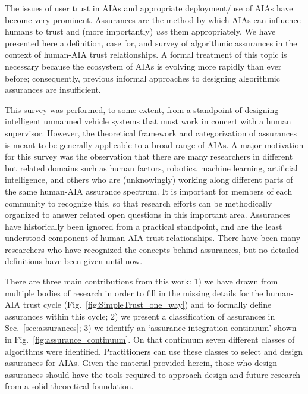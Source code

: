 The issues of user trust in AIAs and appropriate deployment/use of AIAs have become very prominent.  Assurances are the method by which AIAs can influence humans to trust and (more importantly) \emph{use} them appropriately. We have presented here a definition, case for, and survey of algorithmic assurances in the context of human-AIA trust relationships. A formal treatment of this topic is necessary because the ecosystem of AIAs is evolving more rapidly than ever before; consequently, previous informal approaches to designing algorithmic assurances are insufficient. 

This survey was performed, to some extent, from a standpoint of designing intelligent unmanned vehicle systems that must work in concert with a human supervisor. However, the theoretical framework and categorization of assurances is meant to be generally applicable to a broad range of AIAs. A major motivation for this survey was the observation that there are many researchers in different but related domains such as human factors, robotics, machine learning, artificial intelligence, and others who are (unknowingly) working along different parts of the same human-AIA assurance spectrum. It is important for members of each community to recognize this, so that research efforts can be  methodically organized to answer related open questions in this important area. Assurances have historically been ignored from a practical standpoint, and are the least understood component of human-AIA trust relationships. There have been many researchers who have recognized the concepts behind assurances, but no detailed definitions have been given until now.

There are three main contributions from this work: 1) we have drawn from multiple bodies of research in order to fill in the missing details for the human-AIA trust cycle (Fig.~\ref{fig:SimpleTrust_one_way}) and to formally define assurances within this cycle; 2) we present a classification of assurances in Sec.~\ref{sec:assurances}; 3) we identify an `assurance integration continuum' shown in Fig.~\ref{fig:assurance_continuum}. On that continuum seven different classes of algorithms were identified. Practitioners can use these classes to select and design assurances for AIAs. Given the material provided herein, those who design assurances should have the tools required to approach design and future research from a solid theoretical foundation.

